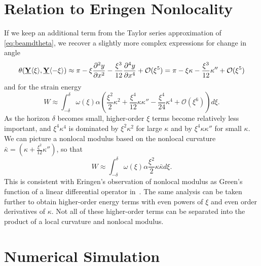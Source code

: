 \documentclass[11pt]{amsart}
\newcommand\vstate[3]{%
	\mathbf{\underline{#1}}%
	\ifstrempty{#2}{}{[#2]}%
	\ifstrempty{#3}{}{\langle #3 \rangle}}
\begin{document}
\section{Relation to Eringen Nonlocality}
If we keep an additional term from the Taylor series approximation of \cref{eq:beamdtheta}, we recover a slightly more complex expressions for change in angle
%
\begin{equation}
\label{eq:beamdtheta2}
\theta(\vstate{Y}{}{\xi},\vstate{Y}{}{\mathbf{-\xi}}) \approx \pi-\xi \frac{\partial^2 y}{\partial x^2} -\frac{\xi^3}{12} \frac{\partial^4 y}{\partial x^4}  +\mathcal{O}(\xi^5)=  \pi-\xi \kappa-\frac{\xi^3}{12} \kappa''+\mathcal{O}(\xi^5)
\end{equation}
%
and for the strain energy
%
%
%
\begin{equation}
W \approx \int_{-\delta}^\delta \omega(\xi)\alpha(\frac{\xi^2}{2}\kappa^2+\frac{\xi^4}{12}\kappa\kappa''-\frac{\xi^4}{24}\kappa^4+\mathcal{O}(\xi^6)) d\xi .
\end{equation}
%
As the horizon \(\delta\) becomes small, higher-order \(\xi\) terms become relatively less important, and \(\xi^4\kappa^4\) is dominated by \(\xi^2\kappa^2\) for large \(\kappa\) and by \(\xi^4\kappa\kappa''\) for small \(\kappa\).
We can picture a nonlocal modulus based on the nonlocal curvature \(\bar{\kappa}= (\kappa + \frac{\xi^2}{12}\kappa'')\), so that 
%
\begin{equation}
W \approx \int_{-\delta}^\delta \omega(\xi)\alpha \frac{\xi^2}{2}\kappa\bar{\kappa}d\xi .
\end{equation}
%  
This is consistent with Eringen's observation of nonlocal modulus as Green's function of a linear differential operator in~\cite{eringen1983differential}. 
The same analysis can be taken further to obtain higher-order energy terms with even powers of \(\xi\) and even order derivatives of \(\kappa\). 
Not all of these higher-order terms can be separated into the product of a local curvature and nonlocal modulus.

\section{Numerical Simulation}
\end{document}
